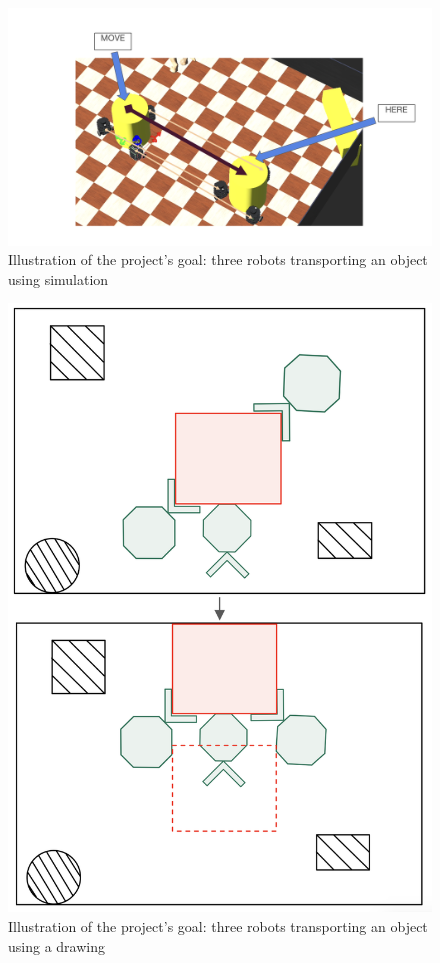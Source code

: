 \begin{figure} [H]
    \centering
    \includegraphics[width=1.0\linewidth]{assets/images/introduction/robot-transport-sim.png}
    \caption{Illustration of the project's goal: three robots transporting an object using simulation}
    \label{fig:robot-transport-sim}
\end{figure}
\begin{figure} [H]
    \centering
    \includegraphics[width=0.75\linewidth]{assets/images/introduction/robot-transport-draw.png}
    \caption{Illustration of the project's goal: three robots transporting an object using a drawing}
    \label{fig:robot-transport-draw}
\end{figure}

